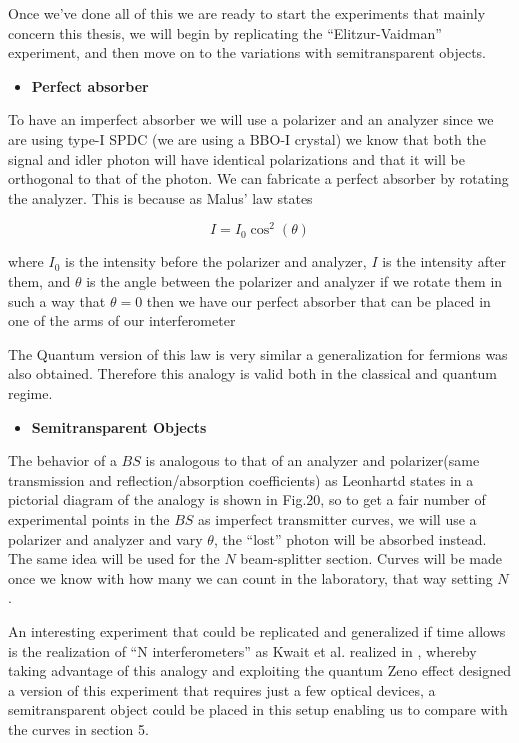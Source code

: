 \documentclass[12pt]{book}
\begin{document}
Once we've done all of this we are ready to start the experiments that mainly concern this thesis, we will begin by replicating the ``Elitzur-Vaidman'' experiment, and then move on to the variations with semitransparent objects.
\begin{itemize}
\item {\large \textbf{Perfect absorber}}
\end{itemize}
To have an imperfect absorber we will use a polarizer and an analyzer since we are using type-I SPDC (we are using a BBO-I crystal) we know that both the signal and idler photon will have identical polarizations and that it will be orthogonal to that of the photon. We can fabricate a perfect absorber by rotating the analyzer. This is because as Malus' law states \cite{hecht}

\begin{equation}
I=I_{0} \cos^{2}(\theta)
\end{equation}

where $I_{0}$ is the intensity before the polarizer and analyzer, $I$ is the intensity after them, and $\theta$ is the angle between the polarizer and analyzer if we rotate them in such a way that $\theta=0$ then we have our perfect absorber that can be placed in one of the arms of our interferometer


The Quantum version of this law is very similar \cite{malus} a generalization for fermions was also obtained. Therefore this analogy is valid both in the classical and quantum regime.
 \begin{itemize}
\item {\large \textbf{Semitransparent Objects}}
\end{itemize}

The behavior of a $BS$ is analogous to that of an analyzer and polarizer(same transmission and reflection/absorption coefficients) as Leonhartd states in \cite{Leonhardt_2003} a pictorial diagram of the analogy is shown in Fig.20, so to get a fair number of experimental points in the $BS$ as imperfect transmitter curves, we will use a polarizer and analyzer and vary $\theta$, the ``lost'' photon will be absorbed instead. The same idea will be used for the $N$ beam-splitter section. Curves will be made once we know with how many we can count in the laboratory, that way setting $N$.


An interesting experiment that could be replicated and generalized if time allows is the realization of ``N interferometers'' as Kwait et al. realized in \cite{exp}, whereby taking advantage of this analogy and exploiting the quantum Zeno effect \cite{zeno} designed a version of this experiment that requires just a few optical devices, a semitransparent object could be placed in this setup enabling us to compare with the curves in section 5.
\end{document}
